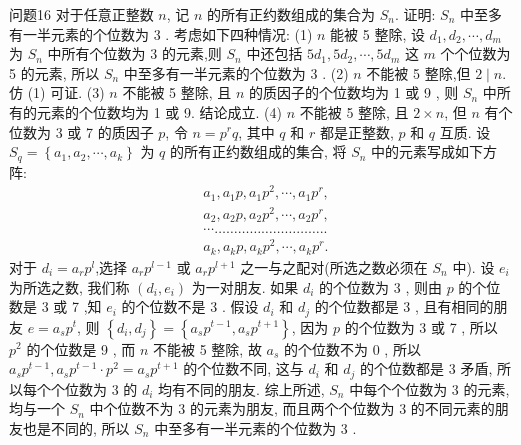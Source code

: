 问题16 对于任意正整数 $n$, 记 $n$ 的所有正约数组成的集合为 $S_n$. 证明: $S_n$ 中至多有一半元素的个位数为 3 .
考虑如下四种情况:
(1) $n$ 能被 5 整除, 设 $d_1, d_2, \cdots, d_m$ 为 $S_n$ 中所有个位数为 3 的元素,则 $S_n$ 中还包括 $5 d_1, 5 d_2, \cdots, 5 d_m$ 这 $m$ 个个位数为 5 的元素, 所以 $S_n$ 中至多有一半元素的个位数为 3 .
(2) $n$ 不能被 5 整除,但 $2 \mid n$. 仿 (1) 可证.
(3) $n$ 不能被 5 整除, 且 $n$ 的质因子的个位数均为 1 或 9 , 则 $S_n$ 中所有的元素的个位数均为 1 或 9. 结论成立.
(4) $n$ 不能被 5 整除, 且 $2 \times n$, 但 $n$ 有个位数为 3 或 7 的质因子 $p$, 令 $n= p^r q$, 其中 $q$ 和 $r$ 都是正整数, $p$ 和 $q$ 互质.
设 $S_q=\left\{a_1, a_2, \cdots, a_k\right\}$ 为 $q$ 的所有正约数组成的集合, 将 $S_n$ 中的元素写成如下方阵:
$$
\begin{aligned}
& a_1, a_1 p, a_1 p^2, \cdots, a_1 p^r, \\
& a_2, a_2 p, a_2 p^2, \cdots, a_2 p^r, \\
& \cdots \ldots \ldots \ldots \ldots \ldots \ldots \ldots \ldots \ldots . . \\
& a_k, a_k p, a_k p^2, \cdots, a_k p^r .
\end{aligned}
$$
对于 $d_i=a_r p^l$,选择 $a_r p^{l-1}$ 或 $a_r p^{l+1}$ 之一与之配对(所选之数必须在 $S_n$ 中). 设 $e_i$ 为所选之数, 我们称 $\left(d_i, e_i\right)$ 为一对朋友.
如果 $d_i$ 的个位数为 3 , 则由 $p$ 的个位数是 3 或 7 ,知 $e_i$ 的个位数不是 3 . 假设 $d_i$ 和 $d_j$ 的个位数都是 3 , 且有相同的朋友 $e=a_s p^t$, 则 $\left\{d_i, d_j\right\}=\left\{a_s p^{t-1}, a_s p^{t+1}\right\}$, 因为 $p$ 的个位数为 3 或 7 , 所以 $p^2$ 的个位数是 9 , 而 $n$ 不能被 5 整除, 故 $a_s$ 的个位数不为 0 , 所以 $a_s p^{t-1}, a_s p^{t-1} \cdot p^2=a_s p^{t+1}$ 的个位数不同, 这与 $d_i$ 和 $d_j$ 的个位数都是 3 矛盾, 所以每个个位数为 3 的 $d_i$ 均有不同的朋友.
综上所述, $S_n$ 中每个个位数为 3 的元素, 均与一个 $S_n$ 中个位数不为 3 的元素为朋友, 而且两个个位数为 3 的不同元素的朋友也是不同的, 所以 $S_n$ 中至多有一半元素的个位数为 3 .



